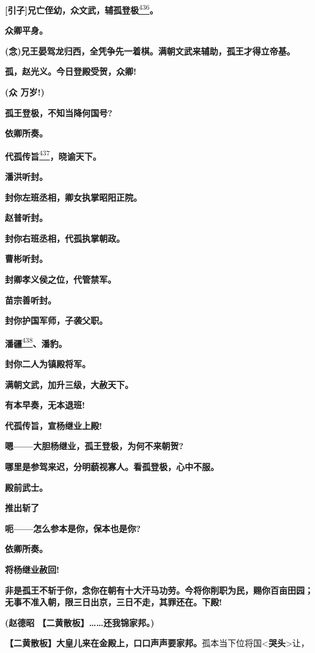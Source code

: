 \textbf{{[}引子{]}兄亡侄幼，众文武，辅孤登极}\protect\hyperlink{fn436}{\textsuperscript{436}}\textbf{。}

\textbf{众卿平身。}

\textbf{(念)兄王晏驾龙归西，全凭争先一着棋。满朝文武来辅助，孤王才得立帝基。}

\textbf{孤，赵光义。今日登殿受贺，众卿!}

\textbf{(众 万岁!)}

\textbf{孤王登极，不知当降何国号?}

\textbf{依卿所奏。}

\textbf{代孤传旨}\protect\hyperlink{fn437}{\textsuperscript{437}}\textbf{，晓谕天下。}

\textbf{潘洪听封。}

\textbf{封你左班丞相，卿女执掌昭阳正院。}

\textbf{赵普听封。}

\textbf{封你右班丞相，代孤执掌朝政。}

\textbf{曹彬听封。}

\textbf{封卿孝义侯之位，代管禁军。}

\textbf{苗宗善听封。}

\textbf{封你护国军师，子袭父职。}

\textbf{潘疆}\protect\hyperlink{fn438}{\textsuperscript{438}}\textbf{、潘豹。}

\textbf{封你二人为镇殿将军。}

\textbf{满朝文武，加升三级，大赦天下。}

\textbf{有本早奏，无本退班!}

\textbf{代孤传旨，宣杨继业上殿!}

\textbf{嗯------大胆杨继业，孤王登极，为何不来朝贺?}

\textbf{哪里是参驾来迟，分明藐视寡人。看孤登极，心中不服。}

\textbf{殿前武士。}

\textbf{推出斩了}

\textbf{呃------怎么参本是你，保本也是你?}

\textbf{依卿所奏。}

\textbf{将杨继业赦回!}

\textbf{非是孤王不斩于你，念你在朝有十大汗马功劳。今将你削职为民，赐你百亩田园；无事不准入朝，限三日出京，三日不走，其罪还在。下殿!}

\textbf{(赵德昭 【二黄散板】\ldots{}\ldots{}还我锦家邦。)}

\textbf{【二黄散板】大皇儿来在金殿上，口口声声要家邦。}孤本当下位将国\textless{}\textbf{哭头}\textgreater{}让，

